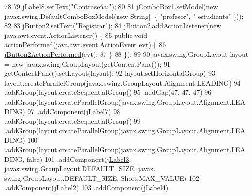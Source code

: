 \begin{DoxyCode}
78 
79         \mbox{\hyperlink{class_interfaz_package_1_1_interfaz_registro_ab71462c00d6d77761293a3876adb4447}{jLabel8}}.setText(\textcolor{stringliteral}{"Contraseña:"});
80 
81         \mbox{\hyperlink{class_interfaz_package_1_1_interfaz_registro_a4c0ea8d0c8cbb3225b39b115bbd0416b}{jComboBox1}}.setModel(\textcolor{keyword}{new} javax.swing.DefaultComboBoxModel(\textcolor{keyword}{new} String[] \{ \textcolor{stringliteral}{"profesor"}, \textcolor{stringliteral}{"
      estudiante"} \}));
82 
83         \mbox{\hyperlink{class_interfaz_package_1_1_interfaz_registro_aece6fd600c53e99fc2b9de62cfcbc0ae}{jButton2}}.setText(\textcolor{stringliteral}{"Registrar"});
84         \mbox{\hyperlink{class_interfaz_package_1_1_interfaz_registro_aece6fd600c53e99fc2b9de62cfcbc0ae}{jButton2}}.addActionListener(\textcolor{keyword}{new} java.awt.event.ActionListener() \{
85             \textcolor{keyword}{public} \textcolor{keywordtype}{void} actionPerformed(java.awt.event.ActionEvent evt) \{
86                 \mbox{\hyperlink{class_interfaz_package_1_1_interfaz_registro_a030f9895f8648d5c1c85dd7b97ea84fb}{jButton2ActionPerformed}}(evt);
87             \}
88         \});
89 
90         javax.swing.GroupLayout layout = \textcolor{keyword}{new} javax.swing.GroupLayout(getContentPane());
91         getContentPane().setLayout(layout);
92         layout.setHorizontalGroup(
93             layout.createParallelGroup(javax.swing.GroupLayout.Alignment.LEADING)
94             .addGroup(layout.createSequentialGroup()
95                 .addGap(47, 47, 47)
96                 .addGroup(layout.createParallelGroup(javax.swing.GroupLayout.Alignment.LEADING)
97                     .addComponent(\mbox{\hyperlink{class_interfaz_package_1_1_interfaz_registro_ad54a5088a93694070b1ff7162a917af7}{jLabel7}})
98                     .addGroup(layout.createSequentialGroup()
99                         .addGroup(layout.createParallelGroup(javax.swing.GroupLayout.Alignment.LEADING)
100                             .addGroup(layout.createParallelGroup(javax.swing.GroupLayout.Alignment.LEADING,
       \textcolor{keyword}{false})
101                                 .addComponent(\mbox{\hyperlink{class_interfaz_package_1_1_interfaz_registro_a4189a19af12bde758a673e961e48f7a1}{jLabel3}}, javax.swing.GroupLayout.DEFAULT\_SIZE, javax.
      swing.GroupLayout.DEFAULT\_SIZE, Short.MAX\_VALUE)
102                                 .addComponent(\mbox{\hyperlink{class_interfaz_package_1_1_interfaz_registro_a8b0b7e848f73f459a71f7677741b8171}{jLabel2}})
103                                 .addComponent(\mbox{\hyperlink{class_interfaz_package_1_1_interfaz_registro_a4dda19c10aa23f67ca06e1b8a5a18912}{jLabel4}})

\end{DoxyCode}
